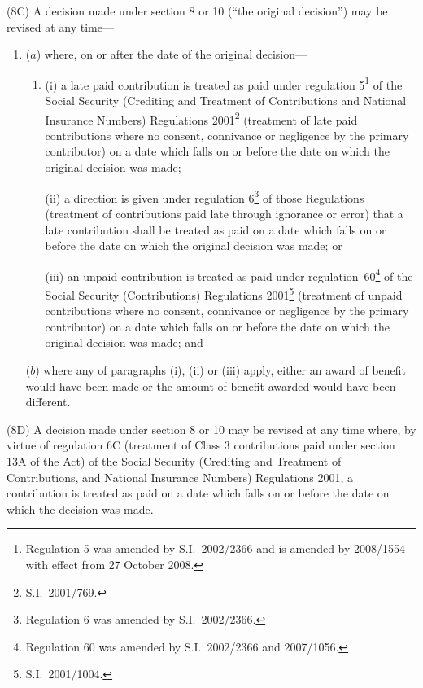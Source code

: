 \documentclass[12pt,a4paper]{article}
\begin{document}
(8C) A decision made under section 8 or 10 (“the original decision”) may be revised at any time—
\begin{enumerate}\item[]
($a$) where, on or after the date of the original decision—
\begin{enumerate}\item[]
(i) a late paid contribution is treated as paid under regulation 5\footnote{Regulation 5 was amended by S.I.~2002/2366 and is amended by 2008/1554 with effect from 27 October 2008.} of the Social Security (Crediting and Treatment of Contributions and National Insurance Numbers) Regulations 2001\footnote{S.I.~2001/769.} (treatment of late paid contributions where no consent, connivance or negligence by the primary contributor) on a date which falls on or before the date on which the original decision was made;

(ii) a direction is given under regulation 6\footnote{Regulation 6 was amended by S.I.~2002/2366.} of those Regulations (treatment of contributions paid late through ignorance or error) that a late contribution shall be treated as paid on a date which falls on or before the date on which the original decision was made; or

(iii) an unpaid contribution is treated as paid under regulation~60\footnote{Regulation 60 was amended by S.I.~2002/2366 and 2007/1056.} of the Social Security (Contributions) Regulations 2001\footnote{S.I.~2001/1004.} (treatment of unpaid contributions where no consent, connivance or negligence by the primary contributor) on a date which falls on or before the date on which the original decision was made; and
\end{enumerate}

($b$) where any of paragraphs (i), (ii) or (iii) apply, either an award of benefit would have been made or the amount of benefit awarded would have been different.
\end{enumerate}

(8D) A decision made under section 8 or 10 may be revised at any time where, by virtue of regulation 6C (treatment of Class 3 contributions paid under section 13A of the Act) of the Social Security (Crediting and Treatment of Contributions, and National Insurance Numbers) Regulations 2001, a contribution is treated as paid on a date which falls on or before the date on which the decision was made.
\end{document}

